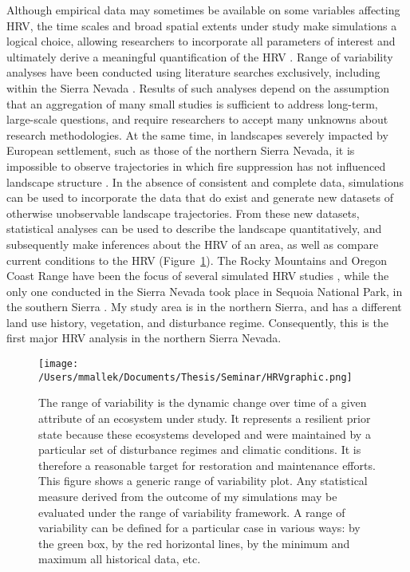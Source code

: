 Although empirical data may sometimes be available on some variables affecting HRV, the time scales and broad spatial extents under study make simulations a logical choice, allowing researchers to incorporate all parameters of interest and ultimately derive a meaningful quantification of the HRV \citep{Swetnam1999,Mladenoff1999}. Range of variability analyses have been conducted using literature searches exclusively, including within the Sierra Nevada \citep[e.g.,][]{Safford2013}. Results of such analyses depend on the assumption that an aggregation of many small studies is sufficient to address long-term, large-scale questions, and require researchers to accept many unknowns about research methodologies. At the same time, in landscapes severely impacted by European settlement, such as those of the northern Sierra Nevada, it is impossible to observe trajectories in which fire suppression has not influenced landscape structure \citep{Keane2012}. In the absence of consistent and complete data, simulations can be used to incorporate the data that do exist and generate new datasets of otherwise unobservable landscape trajectories. From these new datasets, statistical analyses can be used to describe the landscape quantitatively, and subsequently make inferences about the HRV of an area, as well as compare current conditions to the HRV (Figure~\ref{fig:hrvplot}). The Rocky Mountains and Oregon Coast Range have been the focus of several simulated HRV studies \citep{Keane1996,Tinker2003,McGarigal2005,Nonaka2005,Blankenship2015}, while the only one conducted in the Sierra Nevada took place in Sequoia National Park, in the southern Sierra \citep{Miller1999}. My study area is in the northern Sierra, and has a different land use history, vegetation, and disturbance regime. Consequently, this is the first major HRV analysis in the northern Sierra Nevada. 

\begin{figure}[!htbp]
\centering
\texttt{[image: /Users/mmallek/Documents/Thesis/Seminar/HRVgraphic.png]}
\caption{The range of variability is the dynamic change over time of a given attribute of an ecosystem under study. It represents a resilient prior state because these ecosystems developed and were maintained by a particular set of disturbance regimes and climatic conditions. It is therefore a reasonable target for restoration and maintenance efforts. This figure shows a generic range of variability plot. Any statistical measure derived from the outcome of my simulations may be evaluated under the range of variability framework. A range of variability can be defined for a particular case in various ways: by the green box, by the red horizontal lines, by the minimum and maximum all historical data, etc.
}
\label{fig:hrvplot}
\end{figure}

